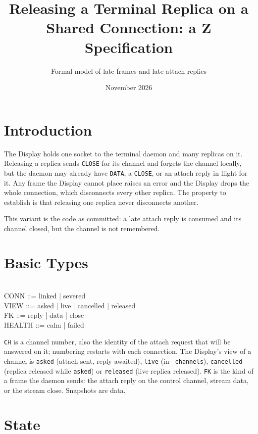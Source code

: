 \documentclass[a4paper,10pt,fleqn]{article}
\begin{document}
\title{Releasing a Terminal Replica on a Shared Connection: a Z Specification}
\author{Formal model of late frames and late attach replies}
\date{November 2026}
\maketitle

\section{Introduction}

The Display holds one socket to the terminal daemon and many replicas on it.
Releasing a replica sends \texttt{CLOSE} for its channel and forgets the
channel locally, but the daemon may already have \texttt{DATA}, a
\texttt{CLOSE}, or an attach reply in flight for it.  Any frame the Display
cannot place raises an error and the Display drops the whole connection, which
disconnects every other replica.  The property to establish is that releasing
one replica never disconnects another.

This variant is the code as committed: a late attach reply is consumed and its channel closed, but the channel is not remembered.

\section{Basic Types}

\begin{zed}
  [CH] \\
  CONN ::= linked | severed \\
  VIEW ::= asked | live | cancelled | released \\
  FK ::= reply | data | close \\
  HEALTH ::= calm | failed
\end{zed}

\texttt{CH} is a channel number, also the identity of the attach request that
will be answered on it; numbering restarts with each connection.  The
Display's view of a channel is \texttt{asked} (attach sent, reply awaited),
\texttt{live} (in \texttt{\_channels}), \texttt{cancelled} (replica released
while \texttt{asked}) or \texttt{released} (live replica released).
\texttt{FK} is the kind of a frame the daemon sends: the attach reply on the
control channel, stream data, or the stream close.  Snapshots are data.

\section{State}
\end{document}
